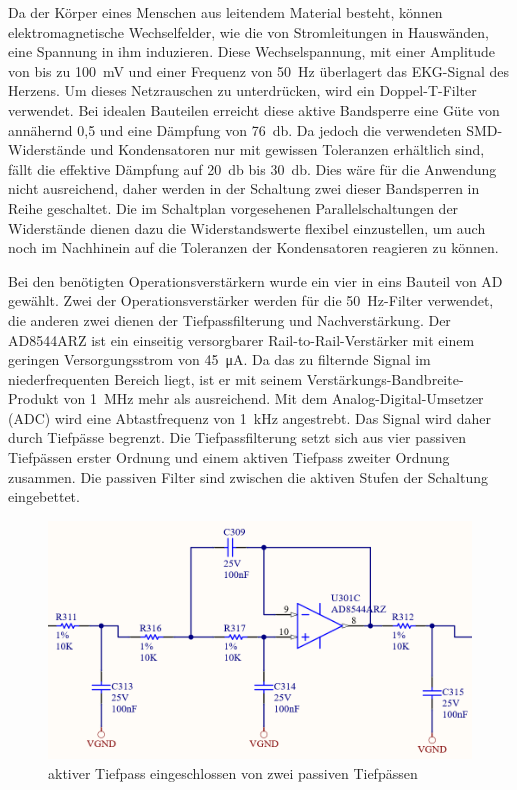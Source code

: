 Da der Körper eines Menschen aus leitendem Material besteht, können elektromagnetische Wechselfelder, wie die von Stromleitungen in Hauswänden, eine Spannung in ihm induzieren. Diese Wechselspannung, mit einer Amplitude von bis zu \SI{100}{\milli\volt} und einer Frequenz von \SI{50}{\hertz} überlagert das EKG-Signal des Herzens. Um dieses Netzrauschen zu unterdrücken, wird ein Doppel-T-Filter verwendet. Bei idealen Bauteilen erreicht diese aktive Bandsperre eine Güte von annähernd 0,5 und eine Dämpfung von \SI{76}{\decibel}. Da jedoch die verwendeten SMD-Widerstände und Kondensatoren nur mit gewissen Toleranzen erhältlich sind, fällt die effektive Dämpfung auf \SI{20}{\decibel} bis \SI{30}{\decibel}. Dies wäre für die Anwendung nicht ausreichend, daher werden in der Schaltung zwei dieser Bandsperren in Reihe geschaltet. Die im Schaltplan vorgesehenen Parallelschaltungen der Widerstände dienen dazu die Widerstandswerte flexibel einzustellen, um auch noch im Nachhinein auf die Toleranzen der Kondensatoren reagieren zu können. 

Bei den benötigten Operationsverstärkern wurde ein vier in eins Bauteil von AD gewählt. Zwei der Operationsverstärker werden für die \SI{50}{\hertz}-Filter verwendet, die anderen zwei dienen der Tiefpassfilterung und Nachverstärkung. Der AD8544ARZ ist ein einseitig versorgbarer Rail-to-Rail-Verstärker mit einem geringen Versorgungsstrom von \SI{45}{\micro\ampere}. Da das zu filternde Signal im niederfrequenten Bereich liegt, ist er mit seinem Verstärkungs-Bandbreite-Produkt von \SI{1}{\mega\hertz} mehr als ausreichend. Mit dem Analog-Digital-Umsetzer (ADC) wird eine Abtastfrequenz von \SI{1}{\kilo\hertz} angestrebt. Das Signal wird daher durch Tiefpässe begrenzt. Die Tiefpassfilterung setzt sich aus vier passiven Tiefpässen erster Ordnung und einem aktiven Tiefpass zweiter Ordnung zusammen. Die passiven Filter sind zwischen die aktiven Stufen der Schaltung eingebettet.

\begin{figure} [!h]
	\includegraphics[width=\textwidth] {EKG_aktiver_Tiefpassfilter.png}
	\caption{aktiver Tiefpass eingeschlossen von zwei passiven Tiefpässen}
	\label{aktiver Tiefpass} 
\end{figure}

